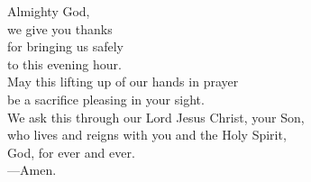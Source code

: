 \prayer


\begin{prayerverse}
Almighty God,\\
we give you thanks\\
for bringing us safely\\
to this evening hour.\\
May this lifting up of our hands in prayer\\
be a sacrifice pleasing in your sight.\\
We ask this through our Lord Jesus Christ, your Son,\\
who lives and reigns with you and the Holy Spirit,\\
God, for ever and ever.\\
{\color{red}---\thinspace}Amen.
\end{prayerverse}

